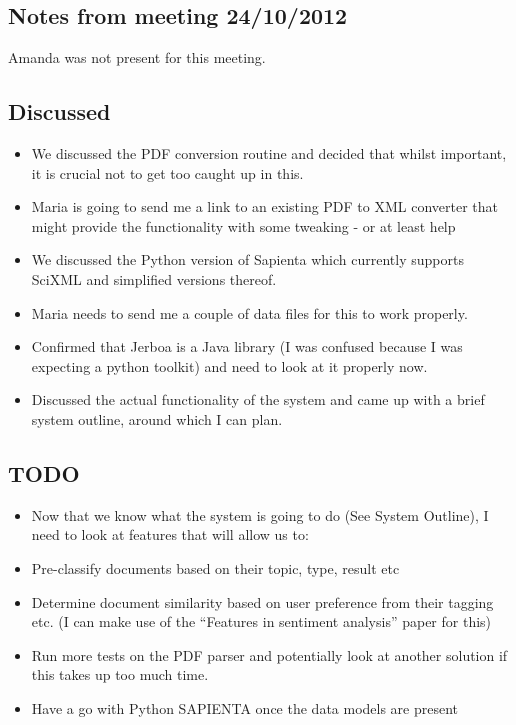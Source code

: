 \subsection{Notes from meeting 24/10/2012}

Amanda was not present for this meeting.

\subsection{Discussed}

\begin{itemize}
\item
  We discussed the PDF conversion routine and decided that whilst
  important, it is crucial not to get too caught up in this.
\item
  Maria is going to send me a link to an existing PDF to XML converter
  that might provide the functionality with some tweaking - or at least
  help
\item
  We discussed the Python version of Sapienta which currently supports
  SciXML and simplified versions thereof.
\item
  Maria needs to send me a couple of data files for this to work
  properly.
\item
  Confirmed that Jerboa is a Java library (I was confused because I was
  expecting a python toolkit) and need to look at it properly now.
\item
  Discussed the actual functionality of the system and came up with a
  brief system outline, around which I can plan.
\end{itemize}

\subsection{TODO}

\begin{itemize}
\item
  Now that we know what the system is going to do (See System Outline), I need to look at features that
  will allow us to:
\item
  Pre-classify documents based on their topic, type, result etc
\item
  Determine document similarity based on user preference from their
  tagging etc. (I can make use of the ``Features in sentiment analysis''
  paper for this)
\item
  Run more tests on the PDF parser and potentially look at another
  solution if this takes up too much time.
\item
  Have a go with Python SAPIENTA once the data models are present
\end{itemize}
